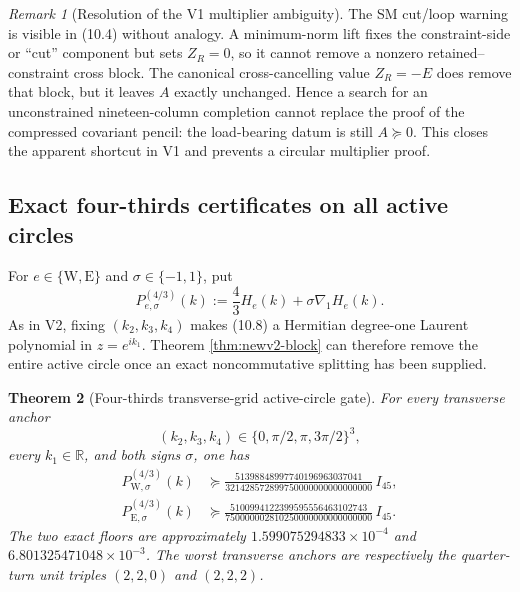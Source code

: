 \documentclass[11pt,oneside]{article}
\newtheorem{theorem}{Theorem}[section]
\theoremstyle{definition}
\theoremstyle{remark}
\newtheorem{remark}[theorem]{Remark}
\begin{document}
\begin{remark}[Resolution of the V1 multiplier ambiguity]
\label{rem:newv10-loop}
The SM cut/loop warning is visible in (10.4) without analogy.  A
minimum-norm lift fixes the constraint-side or ``cut'' component but
sets \(Z_R=0\), so it cannot remove a nonzero retained--constraint
cross block.  The canonical cross-cancelling value \(Z_R=-E\) does
remove that block, but it leaves \(A\) exactly unchanged.  Hence a
search for an unconstrained nineteen-column completion cannot replace
the proof of the compressed covariant pencil: the load-bearing datum
is still \(A\succeq0\).  This closes the apparent shortcut in V1 and
prevents a circular multiplier proof.
\end{remark}

\subsection{Exact four-thirds certificates on all active circles}

For \(e\in\{\mathrm W,\mathrm E\}\) and
\(\sigma\in\{-1,1\}\), put
\[
 P^{(4/3)}_{e,\sigma}(k)
 :=\frac43H_e(k)+\sigma\nabla_1H_e(k).                   \tag{10.11}
\]
As in V2, fixing \((k_2,k_3,k_4)\) makes (10.8) a Hermitian
degree-one Laurent polynomial in \(z=e^{ik_1}\).  Theorem
\ref{thm:newv2-block} can therefore remove the entire active circle
once an exact noncommutative splitting has been supplied.

\begin{theorem}[Four-thirds transverse-grid active-circle gate]
\label{thm:newv10-strong-circles}
For every transverse anchor
\[
 (k_2,k_3,k_4)\in\{0,\pi/2,\pi,3\pi/2\}^3,
\]
every \(k_1\in\mathbb R\), and both signs \(\sigma\), one has
\[
\begin{aligned}
 P^{(4/3)}_{\mathrm W,\sigma}(k)
 &\succeq
 \frac{51398848997740196963037041}
 {321428572899750000000000000000}\,I_{45},\\
 P^{(4/3)}_{\mathrm E,\sigma}(k)
 &\succeq
 \frac{5100994122399595556463102743}
 {750000002810250000000000000000}\,I_{45}.
\end{aligned}                                             \tag{10.12}
\]
The two exact floors are approximately
\(1.599075294833\times10^{-4}\) and
\(6.801325471048\times10^{-3}\).  The worst transverse anchors are
respectively the quarter-turn unit triples \((2,2,0)\) and
\((2,2,2)\).
\end{theorem}
\end{document}
